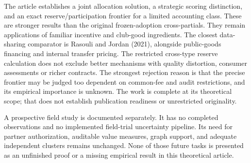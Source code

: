 \documentclass[
  11pt,
]{article}
\begin{document}
The article establishes a joint allocation solution, a strategic scoring
distinction, and an exact reserve/participation frontier for a limited
accounting class. These are stronger results than the original
frozen-adoption cross-partials. They remain applications of familiar
incentive and club-good ingredients. The closest data-sharing comparator
is Rasouli and Jordan (2021), alongside public-goods financing and
internal transfer pricing. The restricted cross-type reserve calculation
does not exclude better mechanisms with quality distortion, consumer
assessments or richer contracts. The strongest rejection reason is that
the precise frontier may be judged too dependent on common-fee and audit
restrictions, and its empirical importance is unknown. The work is
complete at its theoretical scope; that does not establish publication
readiness or unrestricted originality.

A prospective field study is documented separately. It has no completed
observations and no implemented field-trial uncertainty pipeline. Its
need for partner authorization, auditable value measures, graph support,
and adequate independent clusters remains unchanged. None of those
future tasks is presented as an unfinished proof or a missing empirical
result in this theoretical article.
\end{document}
